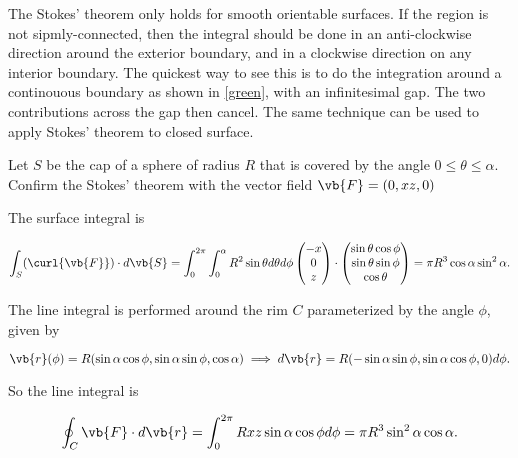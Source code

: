 \documentclass[english,a4paper,12pt]{report}
\begin{document}
The Stokes' theorem only holds for smooth orientable surfaces. If the region is not sipmly-connected, then the integral should be done in an anti-clockwise direction around the exterior boundary, and in a clockwise direction on any interior boundary. The quickest way to see this is to do the integration around a continouous boundary as shown in \cref{green}, with an infinitesimal gap. The two contributions across the gap then cancel. The same technique can be used to apply Stokes' theorem to closed surface.




{Let \(S\) be the cap of a sphere of radius \(R\) that is covered by the angle \(0 \le \theta \le \alpha \). Confirm the Stokes' theorem with the vector field \(\vb{F} = (0,xz,0)\)  }
{The surface integral is 

\begin{equation}
	\int_{S}^{} (\curl{\vb{F} } ) \cdot d\vb{S}  = \int_{0}^{2\pi } \int_{0}^{\alpha } R^2\sin \theta d \theta d\phi \begin{pmatrix}
		 -x \\
		 0 \\
		 z \\
	\end{pmatrix} \cdot  \begin{pmatrix}
		 \sin \theta \cos \phi  \\
		 \sin \theta \sin \phi  \\
		 \cos \theta  \\
	\end{pmatrix} = \pi R^3 \cos \alpha \sin ^2 \alpha .    
\end{equation}

The line integral is performed around the rim \(C\) parameterized by the angle \(\phi \), given by 

\begin{equation}
	\vb{r} (\phi ) = R(\sin \alpha \cos \phi ,\sin \alpha \sin \phi ,\cos \alpha ) \implies d\vb{r} = R(-\sin \alpha \sin \phi , \sin \alpha \cos \phi , 0)d\phi.
\end{equation}

So the line integral is

\begin{equation}
	\oint_{C} \vb{F} \cdot d\vb{r} = \int_{0}^{2\pi } Rxz \sin \alpha \cos \phi d\phi = \pi R^3 \sin ^2\alpha \cos \alpha .  
\end{equation}

} 
\end{document}
